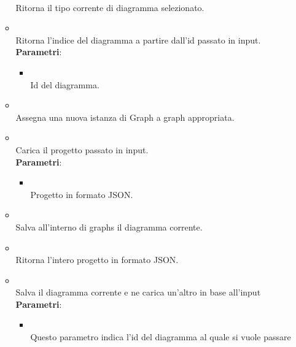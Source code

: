 \begin{itemize}
\begin{itemize}
\\ Ritorna il tipo corrente di diagramma selezionato.
\item {}
\\ Ritorna l'indice del diagramma a partire dall'id passato in input.
\\ \textbf{Parametri}:
\begin{itemize}
\item {}
\\ Id del diagramma.
\end{itemize}
\item {}
\\ Assegna una nuova istanza di Graph a graph appropriata.
\item {}
\\ Carica il progetto passato in input.
\\ \textbf{Parametri}:
\begin{itemize}
\item {}
\\ Progetto in formato JSON.
\end{itemize}
\item {}
\\ Salva all'interno di graphs il diagramma corrente.
\item {}
\\ Ritorna l'intero progetto in formato JSON. %
\item {}
\\ Salva il diagramma corrente e ne carica un'altro in base all'input
\\ \textbf{Parametri}:
\begin{itemize}
\item {}
\\ Questo parametro indica l'id del diagramma al quale si vuole passare
\end{itemize}
\end{itemize}
\end{itemize}
\subsection{}
\label{\nogloxy{swedesigner::client::model::celltypes}}

